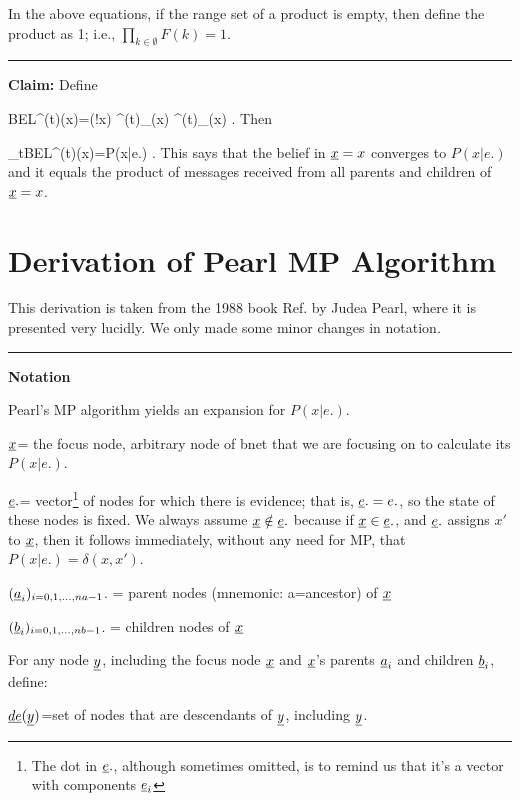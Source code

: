 In the above
equations, if the
range set of a product is empty, then
 define the product as 1; i.e., 
$\prod_{k\in \emptyset}F(k)=1$.


\hrule\noindent
{\bf Claim:} Define

\beq
BEL^{(t)}(x)=\caln(!x)
\lam^{(t)}_\rvx(x)
\pi^{(t)}_\rvx(x)
\;.\eeq
Then

\beq
\lim_{t\rarrow \infty}BEL^{(t)}(x)=P(x|e.)
\;.
\eeq
This  says that
the belief in ${\underline{x}}=x$
converges to $P(x|e.)$ and it
equals the product 
of messages received from all
parents and children of ${\underline{x}}=x$.

\section*{Derivation of Pearl MP Algorithm}

This derivation is taken from
 the 1988 book Ref.\cite{pearl-1988book}
by Judea Pearl, where it
is presented very lucidly. We only
made some minor
changes in notation.

\hrule\noindent
 {\bf Notation}

Pearl's MP algorithm yields an expansion
 for $P(x|e.)$.

${\underline{x}}$= the focus node, 
arbitrary node of bnet that we are 
focusing on to calculate its $P(x|e.)$.

${\underline{e}}.$= vector\footnote{The dot
in ${\underline{e}}.$, although
sometimes omitted,  is
to remind us that it's a vector 
with components 
${\underline{e}}_i$} of nodes for which
 there is evidence; that is,
${\underline{e}}.=e.$, so 
the state of these nodes is fixed.
We always assume ${\underline{x}}\notin {\underline{e}}.$
because if ${\underline{x}}\in {\underline{e}}.$, 
and ${\underline{e}}.$ assigns $x'$ to ${\underline{x}}$,
then it follows immediately, without 
any need for MP, that
$P(x|e.)=\delta(x,x')$.



$({\underline{a}}_i)_{i=0,1, \ldots, na-1}$. = parent nodes
 (mnemonic: a=ancestor) of ${\underline{x}}$

$({\underline{b}}_i)_{i=0,1, \ldots, nb-1}$. = 
children nodes of ${\underline{x}}$

For any node ${\underline{y}}$, including 
the focus node ${\underline{x}}$ and 
${\underline{x}}$'s parents ${\underline{a}}_i$ and children ${\underline{b}}_i$,
define:

$\underline{de}({\underline{y}})$=set of
nodes that are descendants of ${\underline{y}}$,
including ${\underline{y}}$.

